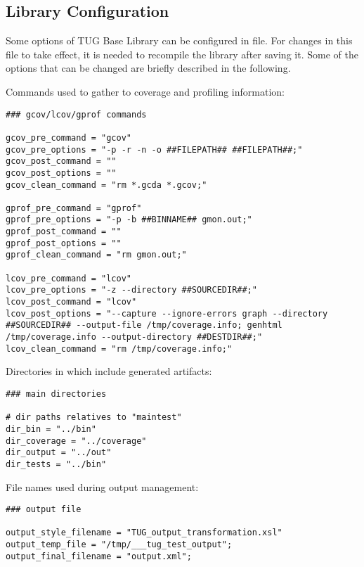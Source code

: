 
\subsection{Library Configuration}

Some options of TUG Base Library can be configured in 
file. For changes in this file to take effect, it is needed to recompile
the library after saving it.
%
Some of the options that can be changed are briefly described in the
following.


\vspace{1ex}

Commands used to gather to coverage and profiling information:
%
\begin{lstlisting}
### gcov/lcov/gprof commands

gcov_pre_command = "gcov"
gcov_pre_options = "-p -r -n -o ##FILEPATH## ##FILEPATH##;"
gcov_post_command = ""
gcov_post_options = ""
gcov_clean_command = "rm *.gcda *.gcov;"

gprof_pre_command = "gprof"
gprof_pre_options = "-p -b ##BINNAME## gmon.out;"
gprof_post_command = ""
gprof_post_options = ""
gprof_clean_command = "rm gmon.out;"

lcov_pre_command = "lcov"
lcov_pre_options = "-z --directory ##SOURCEDIR##;"
lcov_post_command = "lcov"
lcov_post_options = "--capture --ignore-errors graph --directory ##SOURCEDIR## --output-file /tmp/coverage.info; genhtml /tmp/coverage.info --output-directory ##DESTDIR##;"
lcov_clean_command = "rm /tmp/coverage.info;"
\end{lstlisting}


Directories in which include generated artifacts:
%
\begin{lstlisting}
### main directories

# dir paths relatives to "maintest"
dir_bin = "../bin"
dir_coverage = "../coverage"
dir_output = "../out"
dir_tests = "../bin"
\end{lstlisting}


File names used during output management:
%
\begin{lstlisting}
### output file

output_style_filename = "TUG_output_transformation.xsl"
output_temp_file = "/tmp/___tug_test_output";
output_final_filename = "output.xml";
\end{lstlisting}

\newpage







